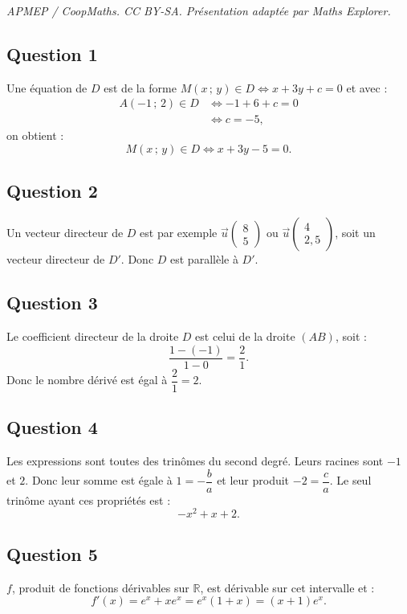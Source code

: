 \documentclass[10pt]{article}
\begin{document}
\noindent\textit{APMEP / CoopMaths. CC BY-SA. Présentation adaptée par Maths Explorer.}\par\medskip
\subsection*{Question 1}
	Une équation de \(D\) est de la forme \(M (x\,;\,y) \in D \iff x + 3y + c = 0\) et avec :
	\begin{align*}
		A(-1\,;\,2) \in D &\iff -1 + 6 + c = 0 \\
		&\iff c = -5,
	\end{align*}
	on obtient :
	\[
	M (x\,;\,y) \in D \iff x + 3y - 5 = 0.
	\]
	
	\subsection*{Question 2}
	Un vecteur directeur de \(D\) est par exemple \(\vec{u} \begin{pmatrix} 8 \\ 5 \end{pmatrix}\) ou \(\vec{u}\begin{pmatrix} 4 \\ 2,5 \end{pmatrix}\), soit un vecteur directeur de \(D'\). Donc \(D\) est parallèle à \(D'\).
	
	\subsection*{Question 3}
	Le coefficient directeur de la droite \(D\) est celui de la droite \((AB)\), soit :
	\[
	\dfrac{1 - (-1)}{1 - 0} = \dfrac{2}{1}.
	\]
	Donc le nombre dérivé est égal à \( \dfrac{2}{1} = 2 \).
	
	\subsection*{Question 4}
	Les expressions sont toutes des trinômes du second degré. Leurs racines sont \(-1\) et \(2\). Donc leur somme est égale à \(1 = -\dfrac{b}{a}\) et leur produit \(-2 = \dfrac{c}{a}\). Le seul trinôme ayant ces propriétés est :
	\[
	-x^2 + x + 2.
	\]
	
	\subsection*{Question 5}
	\(f\), produit de fonctions dérivables sur \(\mathbb{R}\), est dérivable sur cet intervalle et :
	\[
	f'(x) = e^x + x e^x = e^x (1 + x) = (x + 1) e^x.
	\]
\end{document}
